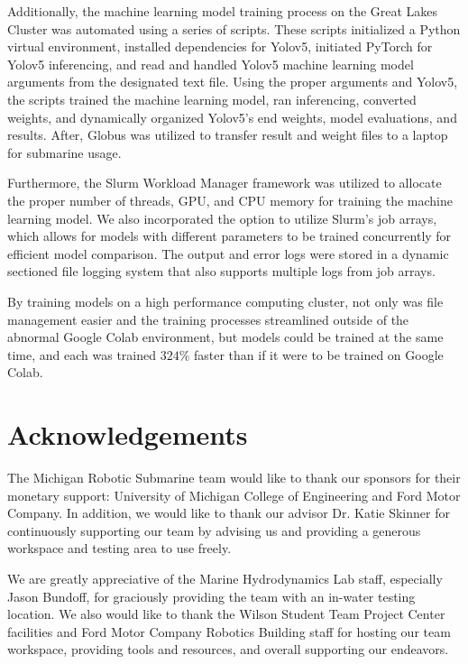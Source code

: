 \documentclass[conference]{IEEEtran}
\begin{document}
    Additionally, the machine learning model training process on the Great Lakes Cluster was automated using a series of scripts. These scripts initialized a Python virtual environment, installed dependencies for Yolov5, initiated PyTorch for Yolov5 inferencing, and read and handled Yolov5 machine learning model arguments from the designated text file. Using the proper arguments and Yolov5, the scripts trained the machine learning model, ran inferencing, converted weights, and dynamically organized Yolov5’s end weights, model evaluations, and results. After, Globus was utilized to transfer result and weight files to a laptop for submarine usage.

    Furthermore, the Slurm Workload Manager framework was utilized to allocate the proper number of threads, GPU, and CPU memory for training the machine learning model. We also incorporated the option to utilize Slurm’s job arrays, which allows for models with different parameters to be trained concurrently for efficient model comparison. The output and error logs were stored in a dynamic sectioned file logging system that also supports multiple logs from job arrays. 

    By training models on a high performance computing cluster, not only was file management easier and the training processes streamlined outside of the abnormal Google Colab environment, but models could be trained at the same time, and each was trained $324\%$ faster than if it were to be trained on Google Colab.
 
\section*{Acknowledgements}

The Michigan Robotic Submarine team would like to thank our sponsors for their monetary support: University of Michigan College of Engineering and Ford Motor Company. In addition, we would like to thank our advisor Dr. Katie Skinner for continuously supporting our team by advising us and providing a generous workspace and testing area to use freely. 

We are greatly appreciative of the Marine Hydrodynamics Lab staff, especially Jason Bundoff, for graciously providing the team with an in-water testing location. We also would like to thank the Wilson Student Team Project Center facilities and Ford Motor Company Robotics Building staff for hosting our team workspace, providing tools and resources, and overall supporting our endeavors. 
\end{document}
